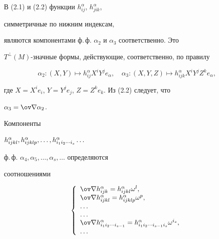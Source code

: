 В (2.1) и (2.2) функции $h^\alpha_{ij}$, $h^\alpha_{jik}$, 


симметричные по нижним индексам, 


являются компонентами ф.\,ф. $\alpha_2$ и $\alpha_3$ соответственно. Это 


$T^\bot(M)$-значные формы, действующие, соответственно, по правилу 


\begin{equation} 


\alpha_2:(X,Y)\mapsto h^\alpha_{ij}X^iY^je_\alpha,\quad 


\alpha_3:(X,Y,Z)\mapsto h^\alpha_{ijk}X^iY^jZ^ke_\alpha, 


\end{equation} 


где $X=X^ie_i$, $Y=Y^je_j$, $Z=Z^ke_k$. Из (2.2) следует, что 


$\alpha_3=\ov\na\alpha_2$. 


Компоненты 


$h^\alpha_{ijkl},h^\alpha_{ijklp},\dotsc,\linebreak


h^\alpha_{i_1i_2\dotsb i_s}\dotsc$ 


ф.\,ф. $\alpha_4,\alpha_5,\dotsc,\alpha_s,\dotsc$ определяются 


соотношениями 


\begin{equation} 


\left\{ 


\begin{array}{l} 


\ov\na h^\alpha_{ijk}=h^\alpha_{ijkl}\omega^l,\\ 


\ov\na h^\alpha_{ijkl}=h^\alpha_{ijklp}\omega^p,\\ 


\dots\\


\dots\\


\ov\na h^\alpha_{i_1i_2\dotsb i_{s-1}}= 


h^\alpha_{i_1i_2\dotsb i_{s-1}i_s}\omega^{i_s},\\ 


\dots


\end{array} 


\right. 


\end{equation} 


